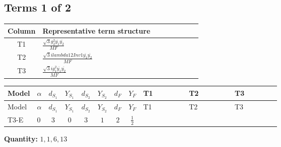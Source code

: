 \documentclass[8pt]{article}
\begin{document}
\begin{landscape}
\subsection*{Terms 1 of 2}
\begin{center}
\begin{tabular}{@{}c >{\raggedright\arraybackslash}p{0.82\linewidth}@{}}
\toprule
Column & Representative term structure \\
\midrule
T1 & \(\displaystyle \frac{\sqrt{3} g_{2}^{2} \overline{y_{1}} \overline{y_{2}}}{MF}\) \\
\midrule
T2 & \(\displaystyle \frac{\sqrt{3} i lambda12Inv1 \overline{y_{1}} \overline{y_{2}}}{MF}\) \\
\midrule
T3 & \(\displaystyle \frac{\sqrt{3} i g_{1}^{2} \overline{y_{1}} \overline{y_{2}}}{MF}\) \\
\midrule
\bottomrule
\end{tabular}
\end{center}
\smallskip
\tiny
\begin{longtable}{@{}llcccccc >{\raggedright\arraybackslash}p{0.21\linewidth} >{\raggedright\arraybackslash}p{0.21\linewidth} >{\raggedright\arraybackslash}p{0.21\linewidth}@{}}
\toprule
Model & $\alpha$ & $d_{S_1}$ & $Y_{S_1}$ & $d_{S_2}$ & $Y_{S_2}$ & $d_F$ & $Y_F$ & T1 & T2 & T3 \\
\midrule
\endfirsthead
\toprule
Model & $\alpha$ & $d_{S_1}$ & $Y_{S_1}$ & $d_{S_2}$ & $Y_{S_2}$ & $d_F$ & $Y_F$ & T1 & T2 & T3 \\
\midrule
\endhead
T3-E & $0$ & $3$ & $0$ & $3$ & $1$ & $2$ & $\frac{1}{2}$ & \scriptsize\adjustbox{max width=\linewidth}{$\begin{gathered} - \frac{\sqrt{3} g_{2}^{2} \overline{y_{1}} \overline{y_{2}}}{6 MF}\end{gathered}$} & \scriptsize\adjustbox{max width=\linewidth}{$\begin{gathered} - \frac{\sqrt{3} i lambda12Inv1 \overline{y_{1}} \overline{y_{2}}}{6 MF}\end{gathered}$} & \scriptsize\adjustbox{max width=\linewidth}{$\begin{gathered} \frac{\sqrt{3} i g_{1}^{2} \overline{y_{1}} \overline{y_{2}}}{8 MF}\end{gathered}$} \\
\midrule
\bottomrule
\end{longtable}
\clearpage
\noindent\textbf{Quantity: }$\mathrm{1,1,6,13}$\par\smallskip

\end{landscape}
\end{document}

